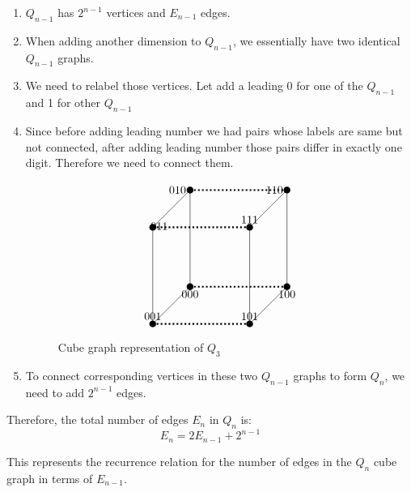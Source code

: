 \documentclass[12pt]{article}
\begin{document}
\begin{enumerate}
    \item \( Q_{n-1} \) has \( 2^{n-1} \) vertices and \( E_{n-1} \) edges.
    \item When adding another dimension to \( Q_{n-1} \), we essentially have two identical \( Q_{n-1} \) graphs.
    \item We need to relabel those vertices. Let add a leading 0 for one of the \( Q_{n-1} \) and 1 for other \( Q_{n-1} \)
    \item Since before adding leading number we had pairs whose labels are same but not connected, after adding leading number those pairs differ in exactly one digit. Therefore we need to connect them. \\
\begin{figure}[H] 
    \[
\begin{tikzpicture}[scale=1.5]
    \coordinate[label=below:000] (000) at (0,0,0);
    \coordinate[label=above:001] (002) at (0,0,2);
    \coordinate[label=left:010] (020) at (0,2,0);
    \coordinate[label={[shift={(0.2,-0.2)}]above:011}] (022) at (0,2,2);
    \coordinate[label=below:100] (200) at (2,0,0);
    \coordinate[label=above:101] (202) at (2,0,2);
    \coordinate[label=left:110] (220) at (2,2,0);
    \coordinate[label=above:111] (222) at (2,2,2);

   \foreach \point in {(000),(002),(020),(022),(200),(202),(220),(222)} {
        \fill \point circle[radius=2pt];
    }
    \draw (000) -- (002) -- (022) -- (020) -- cycle;
    \draw (200) -- (202) -- (222) -- (220) -- cycle;
    \draw[dotted, line width=1.5pt]  (000) -- (200);
    \draw[dotted, line width=1.5pt] (002) -- (202);
    \draw[dotted, line width=1.5pt] (020) -- (220);
    \draw[dotted, line width=1.5pt] (022) -- (222);
\end{tikzpicture}
\]
\caption{Cube graph representation of \(Q_3\)}
\end{figure}
    \item To connect corresponding vertices in these two \( Q_{n-1} \) graphs to form \( Q_n \), we need to add \( 2^{n-1} \) edges.
\end{enumerate}

Therefore, the total number of edges \( E_n \) in \( Q_n \) is:
\[ E_n = 2E_{n-1} + 2^{n-1} \]

This represents the recurrence relation for the number of edges in the \( Q_n \) cube graph in terms of \( E_{n-1} \). \\ \\
\end{document}
